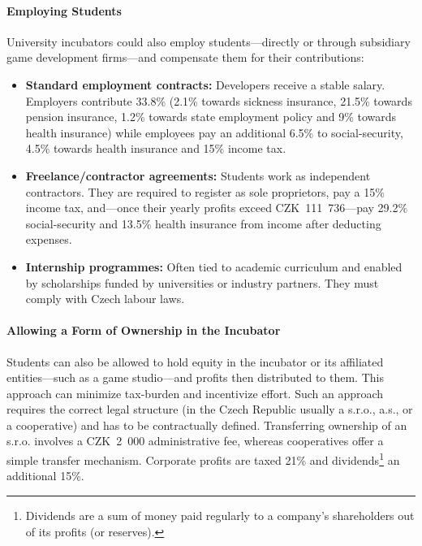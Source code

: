 \paragraph{Employing Students}
University incubators could also employ students—directly or through subsidiary game development firms—and compensate them for their contributions:
\begin{itemize}
    \item \textbf{Standard employment contracts:} Developers receive a stable salary. Employers contribute 33.8\% (2.1\% towards sickness insurance, 21.5\% towards pension insurance, 1.2\% towards state employment policy and 9\% towards health insurance) while employees pay an additional 6.5\% to social-security, 4.5\% towards health insurance and 15\% income tax. \cite{lano-payroll, mpsv-social-sec}
    \item \textbf{Freelance/contractor agreements:} Students work as independent contractors. They are required to register as sole proprietors, pay a 15\% income tax, and—once their yearly profits exceed CZK~111~736—pay 29.2\% social-security and 13.5\% health insurance from income after deducting expenses. \cite{fakturoid-osvc, Zapletalova-osvc, lano-payroll, mpsv-social-sec}
    \item \textbf{Internship programmes:} Often tied to academic curriculum and enabled by scholarships funded by universities or industry partners. They must comply with Czech labour laws.
\end{itemize}

\paragraph{Allowing a Form of Ownership in the Incubator}
Students can also be allowed to hold equity in the incubator or its affiliated entities—such as a game studio—and profits then distributed to them. This approach can minimize tax-burden and incentivize effort. Such an approach requires the correct legal structure (in the Czech Republic usually a s.r.o., a.s., or a cooperative) and has to be contractually defined. Transferring ownership of an s.r.o. involves a CZK~2~000 administrative fee, whereas cooperatives offer a simple transfer mechanism. Corporate profits are taxed 21\% and dividends\footnote{Dividends are a sum of money paid regularly to a company’s shareholders out of its profits (or reserves).} an additional 15\%.
\cite{vajda-llc}

